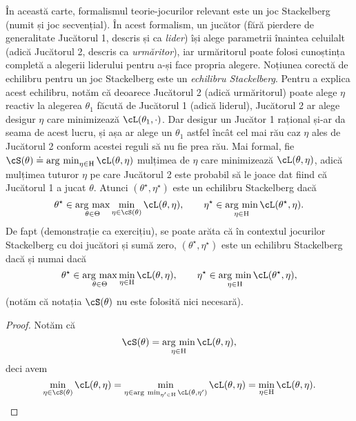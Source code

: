 \documentclass[../../book-main_ro.tex]{subfiles}
\begin{document}
În această carte, formalismul teorie-jocurilor relevant este un joc Stackelberg (numit și joc secvențial). În acest formalism, un jucător (fără pierdere de generalitate Jucătorul 1, descris și ca \textit{lider}) își alege parametrii înaintea celuilalt (adică Jucătorul 2, descris ca \textit{urmăritor}), iar urmăritorul poate folosi cunoștința completă a alegerii liderului pentru a-și face propria alegere. Noțiunea corectă de echilibru pentru un joc Stackelberg este un \textit{echilibru Stackelberg}. Pentru a explica acest echilibru, notăm că deoarece Jucătorul 2 (adică urmăritorul) poate alege \(\eta\) reactiv la alegerea \(\theta_{1}\) făcută de Jucătorul 1 (adică liderul), Jucătorul 2 ar alege desigur \(\eta\) care minimizează \(\cL(\theta_{1}, \cdot)\). Dar desigur un Jucător 1 rațional și-ar da seama de acest lucru, și așa ar alege un \(\theta_{1}\) astfel încât cel mai rău caz \(\eta\) ales de Jucătorul 2 conform acestei reguli să nu fie prea rău. Mai formal, fie \(\cS(\theta) \doteq \argmin_{\eta \in \Eta}\cL(\theta, \eta)\) mulțimea de \(\eta\) care minimizează \(\cL(\theta, \eta)\), adică mulțimea tuturor \(\eta\) pe care Jucătorul 2 este probabil să le joace dat fiind că Jucătorul 1 a jucat \(\theta\). Atunci \((\theta^{\star}, \eta^{\star})\) este un echilibru Stackelberg dacă 
\begin{equation}
    \theta^{\star} \in \argmax_{\theta \in \Theta}\min_{\eta \in \cS(\theta)}\cL(\theta, \eta), \qquad \eta^{\star} \in \argmin_{\eta  \in \Eta}\cL(\theta^{\star}, \eta).
\end{equation}
De fapt (demonstrație ca exercițiu), se poate arăta că în contextul jocurilor Stackelberg cu doi jucători și sumă zero, \((\theta^{\star}, \eta^{\star})\) este un echilibru Stackelberg dacă și numai dacă
\begin{equation}
    \theta^{\star} \in \argmax_{\theta \in \Theta}\min_{\eta \in \Eta}\cL(\theta, \eta), \qquad \eta^{\star} \in \argmin_{\eta  \in \Eta}\cL(\theta^{\star}, \eta),
\end{equation}
(notăm că notația \(\cS(\theta)\) nu este folosită nici necesară). 
\begin{proof} %
    Notăm că 
    \begin{equation}
        \cS(\theta) = \argmin_{\eta \in \Eta}\cL(\theta, \eta),
    \end{equation}
    deci avem 
    \begin{equation}
        \min_{\eta \in \cS(\theta)}\cL(\theta, \eta) = \min_{\eta \in \argmin_{\eta^{\prime} \in \Eta}\cL(\theta, \eta^{\prime})}\cL(\theta, \eta) = \min_{\eta \in \Eta}\cL(\theta, \eta).
    \end{equation}
\end{proof}
\end{document}
